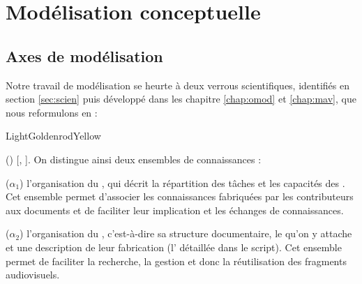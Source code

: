 \section{Modélisation conceptuelle}\label{sec:concept}

\subsection{Axes de modélisation}
Notre travail de modélisation se heurte à deux verrous scientifiques, identifiés en section \ref{sec:scien} puis développé dans les chapitre \ref{chap:omod} et \ref{chap:mav}, que nous reformulons en : 


\begin{problemes}{LightGoldenrodYellow}
\begin{liste}
 	\item[(\g{$\alpha$})]  [, ]. 
 	On distingue ainsi deux ensembles de connaissances : 
 	\begin{listeni} 
 		\item[($\alpha_1$)] l'organisation du , qui décrit la répartition des tâches et  les capacités des .
 		Cet ensemble permet d'associer les connaissances fabriquées par les contributeurs aux documents et de faciliter leur implication et les échanges de connaissances.
 		
 		\item[($\alpha_2$)] l'organisation du , c'est-à-dire sa structure documentaire, le  qu'on y attache et une description de leur fabrication (l' détaillée dans le script).
 		Cet ensemble permet de faciliter la recherche, la gestion et donc la réutilisation des fragments audiovisuels.
 	\end{listeni}


\end{liste}
\end{problemes}
